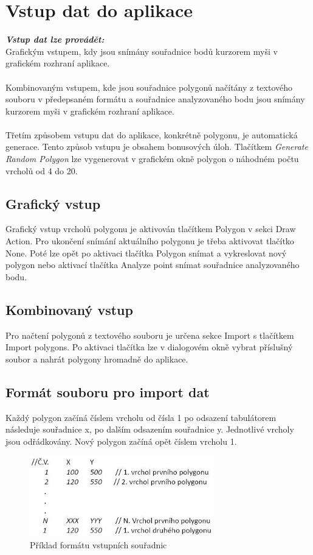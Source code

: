 \documentclass[a4paper, 12pt]{article}
\begin{document}
\section{Vstup dat do aplikace}
\textbf{\textit{Vstup dat lze provádět:}}\\
Grafickým vstupem, kdy jsou snímány souřadnice bodů kurzorem myši v grafickém rozhraní aplikace.\\
\\
Kombinovaným vstupem, kde jsou souřadnice polygonů načítány z textového souboru v předepsaném formátu a souřadnice analyzovaného bodu jsou snímány kurzorem myši v grafickém rozhraní aplikace.\\
\\
Třetím způsobem vstupu dat do aplikace, konkrétně polygonu, je automatická generace. Tento způsob vstupu je obsahem bonusových úloh. Tlačítkem \textit{Generate Random Polygon} lze vygenerovat v grafickém okně polygon o náhodném počtu vrcholů od 4 do 20.

\subsection{Grafický vstup}
Grafický vstup vrcholů polygonu je aktivován tlačítkem Polygon v sekci Draw Action. Pro ukončení snímání aktuálního polygonu je třeba aktivovat tlačítko None. Poté lze opět po aktivaci tlačítka Polygon snímat a vykreslovat nový polygon nebo aktivací tlačítka Analyze point snímat souřadnice analyzovaného bodu.

\subsection{Kombinovaný vstup}
Pro načtení polygonů z textového souboru je určena sekce Import s tlačítkem Import polygons. Po aktivaci tlačítka lze v dialogovém okně vybrat příslušný soubor a nahrát polygony hromadně do aplikace.

\subsection{Formát souboru pro import dat}
Každý polygon začíná číslem vrcholu od čísla 1 po odsazení tabulátorem následuje souřadnice x, po dalším odsazením souřadnice y. Jednotlivé vrcholy jsou odřádkovány. Nový polygon začíná opět číslem vrcholu 1.

\begin{figure}[h!]
	\centering
	\includegraphics[width=8cm]{vstup.jpg}
	\caption{Příklad formátu vstupních souřadnic}
\end{figure}
\end{document}
